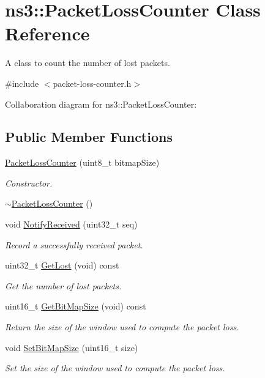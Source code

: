 \hypertarget{classns3_1_1PacketLossCounter}{}\section{ns3\+:\+:Packet\+Loss\+Counter Class Reference}
\label{classns3_1_1PacketLossCounter}


A class to count the number of lost packets.  




{\ttfamily \#include $<$packet-\/loss-\/counter.\+h$>$}



Collaboration diagram for ns3\+:\+:Packet\+Loss\+Counter\+:
\subsection*{Public Member Functions}
\begin{DoxyCompactItemize}
\item 
\hyperlink{classns3_1_1PacketLossCounter_a73950628cb5756f19c2589814d9d6029}{Packet\+Loss\+Counter} (uint8\+\_\+t bitmap\+Size)
\begin{DoxyCompactList}\small\item\em Constructor. \end{DoxyCompactList}\item 
\hyperlink{classns3_1_1PacketLossCounter_aeeb2433d34ce9bb722c123825afd16bc}{$\sim$\+Packet\+Loss\+Counter} ()
\item 
void \hyperlink{classns3_1_1PacketLossCounter_a3ad5968a1f30dd3d0ca79051f07ba72a}{Notify\+Received} (uint32\+\_\+t seq)
\begin{DoxyCompactList}\small\item\em Record a successfully received packet. \end{DoxyCompactList}\item 
uint32\+\_\+t \hyperlink{classns3_1_1PacketLossCounter_a604d5fe48945a46d0d84328e53baa935}{Get\+Lost} (void) const 
\begin{DoxyCompactList}\small\item\em Get the number of lost packets. \end{DoxyCompactList}\item 
uint16\+\_\+t \hyperlink{classns3_1_1PacketLossCounter_ab180f3dac45da2d2e8575c1b93bd8606}{Get\+Bit\+Map\+Size} (void) const 
\begin{DoxyCompactList}\small\item\em Return the size of the window used to compute the packet loss. \end{DoxyCompactList}\item 
void \hyperlink{classns3_1_1PacketLossCounter_a7dac1fee51b61a546554d0e816c142df}{Set\+Bit\+Map\+Size} (uint16\+\_\+t size)
\begin{DoxyCompactList}\small\item\em Set the size of the window used to compute the packet loss. \end{DoxyCompactList}\end{DoxyCompactItemize}
